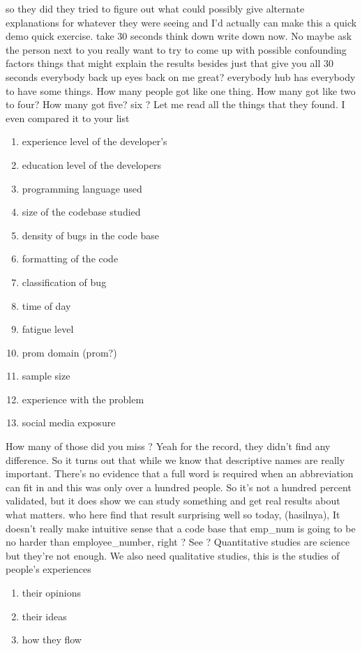 \documentclass[conference, compsoc, twoside]{IEEEtran}
\begin{document}
so they did they tried to figure out
what could possibly give alternate
explanations for whatever they were
seeing and I'd actually can make this a
quick demo quick exercise.
take 30 seconds think down write down now.
No
maybe ask the person next to you really
want to try to come up with possible
confounding factors things that might
explain the results besides just that
give you all 30 seconds everybody back up eyes back on me great?
everybody hub has everybody to have some
things.
How many people got like one thing. 
How many got like two to four? 
How many got five? six ?
Let me read all the things that they found.
I even compared it to your list
\begin{enumerate}
\item experience level of the developer's
\item education level of the developers
\item programming language used 
\item size of the codebase studied
\item density of bugs in the code base 
\item formatting of the code
\item classification of bug 
\item time of day
\item fatigue level 
\item prom domain (prom?)
\item sample size
\item experience with the problem 
\item social media exposure
\end{enumerate}
How many of those did you miss ?
Yeah for the record, they didn't find any difference.
So it turns out that while we know that descriptive names are really important.
There's no evidence that a full word is required when an abbreviation can fit in and this was only over a hundred people. So it's not a hundred percent validated, but it does show we can study something and get real results about what matters. who here find that result surprising well so today, (hasilnya), It doesn’t really make intuitive sense that a code base that emp\_num is going to be no harder than employee\_number, right ? See ? Quantitative studies are science but they’re not enough.
We also need qualitative studies, this is the studies of people’s experiences
\begin{enumerate}
\item their opinions
\item their ideas
\item how they flow
\end{enumerate}
\end{document}
